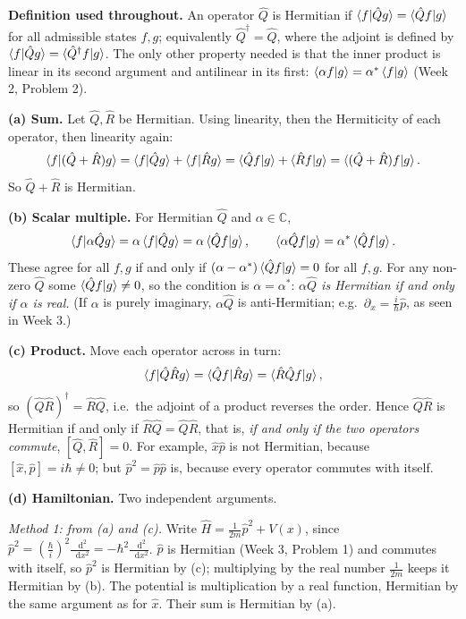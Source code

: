 \documentclass[12pt]{article}
\newif\ifsolutions
\renewcommand{\d}{\mathop{}\!\mathrm{d}}
\begin{document}
\ifsolutions
\begin{solutionbox}
\textbf{Definition used throughout.} An operator $\hat Q$ is Hermitian if $\braket{f|\hat Qg}=\braket{\hat Qf|g}$ for all admissible states $f,g$; equivalently $\hat Q^\dagger=\hat Q$, where the adjoint is defined by $\braket{f|\hat Qg}=\braket{\hat Q^\dagger f|g}$. The only other property needed is that the inner product is linear in its second argument and antilinear in its first: $\braket{\alpha f|g}=\alpha^*\braket{f|g}$ (Week 2, Problem 2).

\textbf{(a) Sum.} Let $\hat Q,\hat R$ be Hermitian. Using linearity, then the Hermiticity of each operator, then linearity again:
\[
\braket{f|(\hat Q+\hat R)g}=\braket{f|\hat Qg}+\braket{f|\hat Rg}=\braket{\hat Qf|g}+\braket{\hat Rf|g}=\braket{(\hat Q+\hat R)f|g}.
\]
So $\hat Q+\hat R$ is Hermitian.

\textbf{(b) Scalar multiple.} For Hermitian $\hat Q$ and $\alpha\in\mathbb C$,
\[
\braket{f|\alpha\hat Qg}=\alpha\braket{f|\hat Qg}=\alpha\braket{\hat Qf|g},\qquad
\braket{\alpha\hat Qf|g}=\alpha^*\braket{\hat Qf|g}.
\]
These agree for all $f,g$ if and only if $(\alpha-\alpha^*)\braket{\hat Qf|g}=0$ for all $f,g$. For any non-zero $\hat Q$ some $\braket{\hat Qf|g}\neq0$, so the condition is $\alpha=\alpha^*$: \emph{$\alpha\hat Q$ is Hermitian if and only if $\alpha$ is real.} (If $\alpha$ is purely imaginary, $\alpha\hat Q$ is anti-Hermitian; e.g.\ $\partial_x=\frac{i}{\hbar}\hat p$, as seen in Week 3.)

\textbf{(c) Product.} Move each operator across in turn:
\[
\braket{f|\hat Q\hat Rg}=\braket{\hat Qf|\hat Rg}=\braket{\hat R\hat Qf|g},
\]
so $(\hat Q\hat R)^\dagger=\hat R\hat Q$, i.e.\ the adjoint of a product reverses the order. Hence $\hat Q\hat R$ is Hermitian if and only if $\hat R\hat Q=\hat Q\hat R$, that is, \emph{if and only if the two operators commute}, $[\hat Q,\hat R]=0$. For example, $\hat x\hat p$ is not Hermitian, because $[\hat x,\hat p]=i\hbar\neq0$; but $\hat p^2=\hat p\hat p$ is, because every operator commutes with itself.

\textbf{(d) Hamiltonian.} Two independent arguments.

\emph{Method 1: from (a) and (c).} Write $\hat H=\frac{1}{2m}\hat p^2+V(x)$, since $\hat p^2=(\frac{\hbar}{i})^2\frac{\d^2}{\d x^2}=-\hbar^2\frac{\d^2}{\d x^2}$. $\hat p$ is Hermitian (Week 3, Problem 1) and commutes with itself, so $\hat p^2$ is Hermitian by (c); multiplying by the real number $\frac{1}{2m}$ keeps it Hermitian by (b). The potential is multiplication by a real function, Hermitian by the same argument as for $\hat x$. Their sum is Hermitian by (a).


\end{solutionbox}
\end{document}
